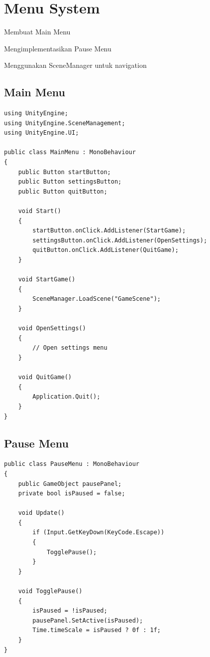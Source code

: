 
\section{Menu System}

\begin{learningoutcomes}
\item Membuat Main Menu
\item Mengimplementasikan Pause Menu
\item Menggunakan SceneManager untuk navigation
\end{learningoutcomes}

\subsection{Main Menu}

\begin{lstlisting}[language={[Sharp]C}]
using UnityEngine;
using UnityEngine.SceneManagement;
using UnityEngine.UI;

public class MainMenu : MonoBehaviour
{
    public Button startButton;
    public Button settingsButton;
    public Button quitButton;
    
    void Start()
    {
        startButton.onClick.AddListener(StartGame);
        settingsButton.onClick.AddListener(OpenSettings);
        quitButton.onClick.AddListener(QuitGame);
    }
    
    void StartGame()
    {
        SceneManager.LoadScene("GameScene");
    }
    
    void OpenSettings()
    {
        // Open settings menu
    }
    
    void QuitGame()
    {
        Application.Quit();
    }
}
\end{lstlisting}

\subsection{Pause Menu}

\begin{lstlisting}[language={[Sharp]C}]
public class PauseMenu : MonoBehaviour
{
    public GameObject pausePanel;
    private bool isPaused = false;
    
    void Update()
    {
        if (Input.GetKeyDown(KeyCode.Escape))
        {
            TogglePause();
        }
    }
    
    void TogglePause()
    {
        isPaused = !isPaused;
        pausePanel.SetActive(isPaused);
        Time.timeScale = isPaused ? 0f : 1f;
    }
}
\end{lstlisting}

